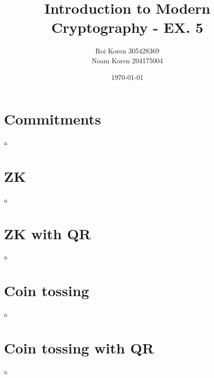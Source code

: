 \documentclass{article}
\begin{document}
\title{Introduction to Modern Cryptography - EX. 5}
\author{Roi Koren 305428369\\ Noam Koren 204175004}
\date{\today}
\maketitle
\newpage
{}

\section{Commitments}
\begin{paragraph}
    a 
\end{paragraph}

\section{ZK}
\begin{paragraph}
    a 
\end{paragraph}

\section{ZK with QR}
\begin{paragraph}
    a 
\end{paragraph}

\section{Coin tossing}
\begin{paragraph}
    a 
\end{paragraph}

\section{Coin tossing with QR}
\begin{paragraph}
    a 
\end{paragraph}
\end{document}
